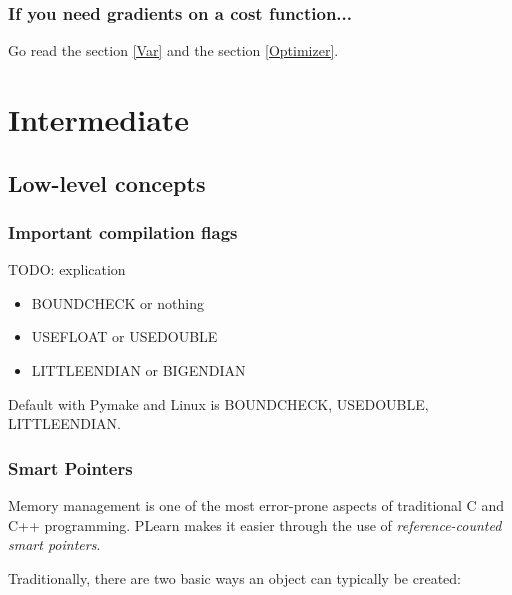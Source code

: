 \documentclass[11pt]{book}
\begin{document}
\subsection{If you need gradients on a cost function...}

Go read the section \ref{Var} and the section \ref{Optimizer}.

\chapter{Intermediate}

\section{Low-level concepts}

\subsection{Important compilation flags}
TODO: explication

\begin{itemize}
\item BOUNDCHECK or nothing
\item USEFLOAT or USEDOUBLE
\item LITTLEENDIAN or BIGENDIAN
\end{itemize}
 Default with Pymake and Linux is BOUNDCHECK, USEDOUBLE, \linebreak
LITTLEENDIAN.

\subsection{Smart Pointers}
\label{PP}
 Memory management is one of the most error-prone aspects of traditional
C and C++ programming. PLearn makes it easier through the use of
\emph{reference-counted smart pointers}.

 Traditionally, there are two basic ways an object can typically be created: 
\end{document}
